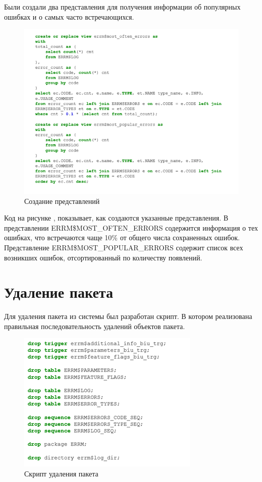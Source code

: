 Были создали два представления для получения информации об популярных ошибках и о самых часто встречающихся. 

\begin{figure}[ht!] 
	\center
	\includegraphics [scale=1] {my_folder/img/c3_view_code.png}
	\caption{Создание представлений} 
	\label{fig:c3_view_code}  
\end{figure}
\FloatBarrier

Код на рисунке , показывает, как создаются указанные представления. 
В представлении ERRM\$MOST\_OFTEN\_ERRORS содержится информация о тех ошибках, что встречаются чаще 10\% от общего числа сохраненных ошибок. 
Представление ERRM\$MOST\_POPULAR\_ERRORS содержит список всех возникших ошибок, отсортированный по количеству появлений. 


\section{Удаление пакета} \label{ch3:sec10}

Для удаления пакета из системы был разработан скрипт. В котором реализована правильная последовательность удалений объектов пакета. 

\begin{figure}[ht!] 
	\center
	\includegraphics [scale=1] {my_folder/img/c3_uninstall.png}
	\caption{Скрипт удаления пакета} 
	\label{fig:c3_uninstall}  
\end{figure}
\FloatBarrier

